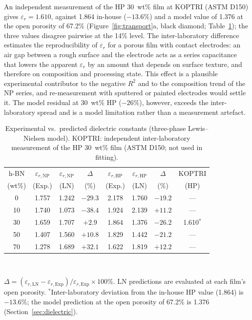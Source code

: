 \documentclass[preprint,a4paper]{elsarticle}
\newcommand{\eps}{\ensuremath{\varepsilon_r}}   %
\begin{document}
An independent measurement of the HP 30~wt\% film at KOPTRI (ASTM D150) gives $\eps = 1.610$, against 1.864 in-house ($-13.6\%$) and a model value of 1.376 at the open porosity of 67.2\% (Figure~\ref{fig:transport}a, black diamond; Table~\ref{tab:dielectric}); the three values disagree pairwise at the 14\% level. The inter-laboratory difference estimates the reproducibility of \eps{} for a porous film with contact electrodes: an air gap between a rough surface and the electrode acts as a series capacitance that lowers the apparent \eps{} by an amount that depends on surface texture, and therefore on composition and processing state. This effect is a plausible experimental contributor to the negative $R^2$ and to the composition trend of the NP series, and re-measurement with sputtered or painted electrodes would settle it. The model residual at 30~wt\% HP ($-26\%$), however, exceeds the inter-laboratory spread and is a model limitation rather than a measurement artefact.

\begin{table}[htbp]
\centering
\caption{Experimental vs.\ predicted dielectric constants (three-phase Lewis--Nielsen model). KOPTRI: independent inter-laboratory measurement of the HP 30~wt\% film (ASTM D150; not used in fitting).}
\label{tab:dielectric}
\small
\begin{tabular}{@{}cccccccc@{}}
\toprule
h-BN & $\varepsilon_{r,\mathrm{NP}}$ & $\varepsilon_{r,\mathrm{NP}}$ & $\Delta$ & $\varepsilon_{r,\mathrm{HP}}$ & $\varepsilon_{r,\mathrm{HP}}$ & $\Delta$ & KOPTRI \\
(wt\%) & (Exp.) & (LN) & (\%) & (Exp.) & (LN) & (\%) & (HP) \\
\midrule
0  & 1.757 & 1.242 & $-29.3$ & 2.178 & 1.760 & $-19.2$ & --- \\
10 & 1.740 & 1.073 & $-38.4$ & 1.924 & 2.139 & $+11.2$ & --- \\
30 & 1.659 & 1.707 & $+2.9$  & 1.864 & 1.376 & $-26.2$ & 1.610$^{*}$ \\
50 & 1.407 & 1.560 & $+10.8$ & 1.829 & 1.442 & $-21.2$ & --- \\
70 & 1.278 & 1.689 & $+32.1$ & 1.622 & 1.819 & $+12.2$ & --- \\
\bottomrule
\end{tabular}\\[3pt]
\parbox{0.95\linewidth}{\footnotesize $\Delta = (\varepsilon_{r,\mathrm{LN}} - \varepsilon_{r,\mathrm{Exp}})/\varepsilon_{r,\mathrm{Exp}} \times 100\%$. LN predictions are evaluated at each film's open porosity. $^{*}$Inter-laboratory deviation from the in-house HP value (1.864) is $-13.6\%$; the model prediction at the open porosity of 67.2\% is 1.376 (Section~\ref{sec:dielectric}).}
\end{table}
\end{document}
